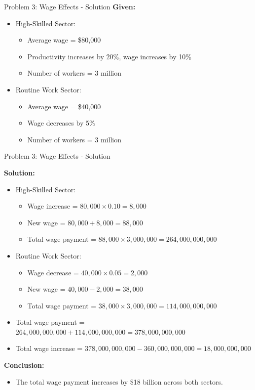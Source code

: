 \documentclass{beamer}
\begin{document}
\begin{frame}{Problem 3: Wage Effects - Solution}
\textbf{Given:}
\begin{itemize}
    \item High-Skilled Sector:
    \begin{itemize}
        \item Average wage = \$80,000
        \item Productivity increases by 20\%, wage increases by 10\%
        \item Number of workers = 3 million
    \end{itemize}
    \item Routine Work Sector:
    \begin{itemize}
        \item Average wage = \$40,000
        \item Wage decreases by 5\%
        \item Number of workers = 3 million
    \end{itemize}
\end{itemize}

\end{frame}


\begin{frame}{Problem 3: Wage Effects - Solution}


\textbf{Solution:}
\begin{itemize}
    \item High-Skilled Sector:
    \begin{itemize}
        \item Wage increase = \( 80,000 \times 0.10 = 8,000 \)
        \item New wage = \( 80,000 + 8,000 = 88,000 \)
        \item Total wage payment = \( 88,000 \times 3,000,000 = 264,000,000,000 \)
    \end{itemize}
    \item Routine Work Sector:
    \begin{itemize}
        \item Wage decrease = \( 40,000 \times 0.05 = 2,000 \)
        \item New wage = \( 40,000 - 2,000 = 38,000 \)
        \item Total wage payment = \( 38,000 \times 3,000,000 = 114,000,000,000 \)
    \end{itemize}
    \item Total wage payment = \( 264,000,000,000 + 114,000,000,000 = 378,000,000,000 \)
    \item Total wage increase = \( 378,000,000,000 - 360,000,000,000 = 18,000,000,000 \)
\end{itemize}

\textbf{Conclusion:}
\begin{itemize}
    \item The total wage payment increases by \$18 billion across both sectors.
\end{itemize}
\end{frame}
\end{document}
